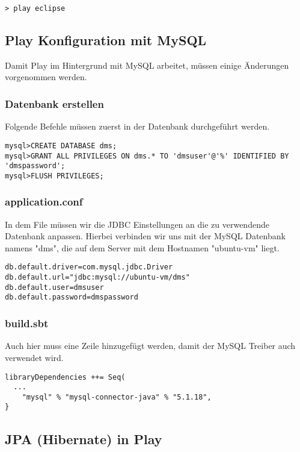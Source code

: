 \documentclass[11pt, a4paper]{article}
\begin{document}
\begin{lstlisting}
> play eclipse
\end{lstlisting}

\subsection{Play Konfiguration mit MySQL}

Damit Play im Hintergrund mit MySQL arbeitet, müssen einige Änderungen vorgenommen werden.

\subsubsection*{Datenbank erstellen}

Folgende Befehle müssen zuerst in der Datenbank durchgeführt werden.

\begin{lstlisting}
mysql>CREATE DATABASE dms;
mysql>GRANT ALL PRIVILEGES ON dms.* TO 'dmsuser'@'%' IDENTIFIED BY 'dmspassword';
mysql>FLUSH PRIVILEGES;\end{lstlisting}


\subsubsection*{application.conf}

In dem File müssen wir die JDBC Einstellungen an die zu verwendende Datenbank anpassen. Hierbei verbinden wir uns mit der MySQL Datenbank namens "dms", die auf dem Server mit dem Hostnamen "ubuntu-vm" liegt. 

\begin{lstlisting}
db.default.driver=com.mysql.jdbc.Driver
db.default.url="jdbc:mysql://ubuntu-vm/dms"
db.default.user=dmsuser
db.default.password=dmspassword\end{lstlisting}

\subsubsection*{build.sbt}

Auch hier muss eine Zeile hinzugefügt werden, damit der MySQL Treiber auch verwendet wird.
\begin{lstlisting}
libraryDependencies ++= Seq(
  ...
	"mysql" % "mysql-connector-java" % "5.1.18",
}\end{lstlisting}

\subsection{JPA (Hibernate) in Play}
\end{document}
